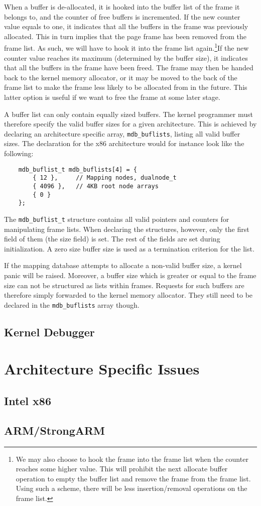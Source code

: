 \documentclass[a4paper,twoside]{book}
\begin{document}
When a buffer is de-allocated, it is hooked into the buffer list of
the frame it belongs to, and the counter of free buffers is
incremented.  If the new counter value equals to one, it indicates
that all the buffers in the frame was previously allocated.  This in
turn implies that the page frame has been removed from the frame list.
As such, we will have to hook it into the frame list
again.\footnote{We may also choose to hook the frame into the frame
  list when the counter reaches some higher value.  This will prohibit
  the next allocate buffer operation to empty the buffer list and
  remove the frame from the frame list.  Using such a scheme, there
  will be less insertion/removal operations on the frame list.}\@ If
the new counter value reaches its maximum (determined by the buffer
size), it indicates that all the buffers in the frame have been freed.
The frame may then be handed back to the kernel memory allocator, or
it may be moved to the back of the frame list to make the frame less
likely to be allocated from in the future.  This latter option is
useful if we want to free the frame at some later stage.

A buffer list can only contain equally sized buffers.  The kernel
programmer must therefore specify the valid buffer sizes for a given
architecture.  This is achieved by declaring an architecture specific
array, \texttt{mdb\_buflists}, listing all valid buffer sizes.  The
declaration for the x86 architecture would for instance look like the
following:

{\small
\begin{verbatim}
    mdb_buflist_t mdb_buflists[4] = {
        { 12 },     // Mapping nodes, dualnode_t
        { 4096 },   // 4KB root node arrays
        { 0 }
    };
\end{verbatim}
}

The \texttt{mdb\_buflist\_t} structure contains all valid pointers and
counters for manipulating frame lists.  When declaring the structures,
however, only the first field of them (the size field) is set.  The
rest of the fields are set during initialization.  A zero size buffer
size is used as a termination criterion for the list.

If the mapping database attempts to allocate a non-valid buffer size,
a kernel panic will be raised.  Moreover, a buffer size which is
greater or equal to the frame size can not be structured as lists
within frames.  Requests for such buffers are therefore simply
forwarded to the kernel memory allocator.  They still need to be
declared in the \texttt{mdb\_buflists} array though.



\section{Kernel Debugger}




\chapter{Architecture Specific Issues}

\section{Intel x86}

\section{ARM/StrongARM}
\end{document}
